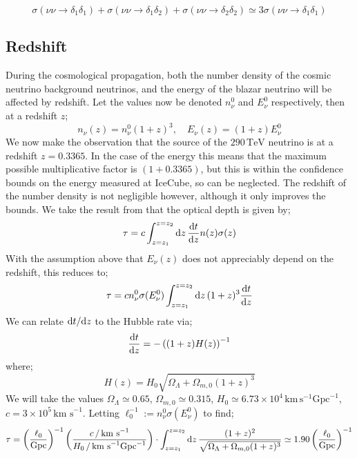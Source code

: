 \documentclass[10pt]{article}
\begin{document}
\begin{equation}
  \sigma(\nu\nu \rightarrow \delta_1 \delta_1) + \sigma(\nu\nu \rightarrow \delta_1 \delta_2) + \sigma(\nu\nu \rightarrow \delta_2 \delta_2) \simeq 3 \sigma(\nu\nu \rightarrow \delta_1 \delta_1)
\end{equation}
\subsection{Redshift}
During the cosmological propagation, both the number density of the cosmic neutrino background neutrinos, and the energy of the blazar neutrino will be affected by redshift. Let the values now be denoted $n_\nu^0$ and $E_\nu^0$ respectively, then at a redshift $z$;
\begin{equation}
  n_\nu(z) = n_\nu^0 (1 + z)^3, \quad E_\nu(z) = (1 + z)E_\nu^0
\end{equation}
We now make the observation that the source of the $290 \, \textrm{TeV}$ neutrino is at a redshift $z = 0.3365$. In the case of the energy this means that the maximum possible multiplicative factor is $(1 + 0.3365)$, but this is within the confidence bounds on the energy measured at IceCube, so can be neglected. The redshift of the number density is not negligible however, although it only improves the bounds. We take the result from \cite{Farzan2014} that the optical depth is given by;
\begin{equation}
  \tau = c\int_{z = z_1}^{z = z_2}{\text{d}z \,\frac{\text{d} t}{\text{d} z}n(z)\sigma(z)}
\end{equation}
With the assumption above that $E_\nu(z)$ does not appreciably depend on the redshift, this reduces to;
\begin{equation}
  \tau = c n_\nu^0 \sigma(E_\nu^0) \int_{z = z_1}^{z = z_2}{\text{d}z \,(1 + z)^3 \frac{\text{d} t}{\text{d} z}}
\end{equation}
We can relate $\text{d} t/\text{d} z$ to the Hubble rate via;
\begin{equation}
  \frac{\text{d} t}{\text{d} z} = -\left((1 + z)H(z)\right)^{-1}
\end{equation}
where;
\begin{equation}
  H(z) = H_0 \sqrt{\Omega_\Lambda + \Omega_{m,0}(1 + z)^3}
\end{equation}
We will take the values $\Omega_\Lambda \simeq 0.65$, $\Omega_{m,0} \simeq 0.315$, $H_0 \simeq 6.73 \times 10^{4}\, \textrm{km}\,\textrm{s}^{-1}\textrm{Gpc}^{-1}$, $c = 3\times 10^{5}\,\textrm{km s}^{-1}$. Letting $\ell_0^{-1} := n_\nu^0 \sigma(E_\nu^0)$ to find;
\begin{equation}
  \tau = \left(\frac{\ell_0}{\text{Gpc}}\right)^{-1} \left(\frac{c \, / \, \text{km s}^{-1}}{H_0 \, /\, \text{km s}^{-1}\text{Gpc}^{-1}}\right) \cdot \int_{z = z_1}^{z = z_2}{\text{d}z \,\frac{(1 + z)^2}{\sqrt{\Omega_\Lambda + \Omega_{m,0}(1 + z)^3}}} \simeq 1.90 \left(\frac{\ell_0}{\textrm{Gpc}}\right)^{-1}
\end{equation}
\end{document}
